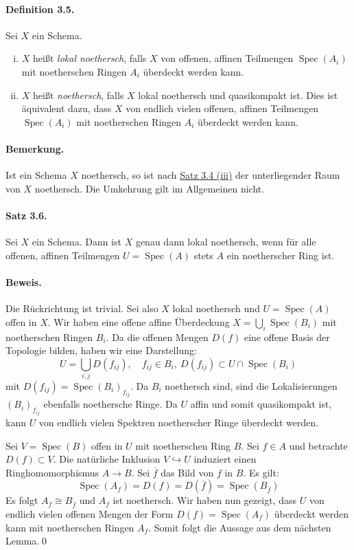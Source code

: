 \paragraph{Definition 3.5.}\label{3.5} Sei $X$ ein Schema.
\begin{enumerate}[(i)]
\item $X$ heißt \textit{lokal noethersch}, falls $X$ von offenen, affinen Teilmengen $\operatorname{Spec}(A_i)$ mit noetherschen Ringen $A_i$ überdeckt werden kann.
\item $X$ heißt \textit{noethersch}, falls $X$ lokal noethersch und quasikompakt ist. Dies ist äquivalent dazu, dass $X$ von endlich vielen offenen, affinen Teilmengen $\operatorname{Spec}(A_i)$ mit noetherschen Ringen $A_i$ überdeckt werden kann.
\end{enumerate}

\paragraph{Bemerkung.} Ist ein Schema $X$ noethersch, so ist nach \hyperref[3.4]{Satz 3.4 (iii)} der unterliegender Raum von $X$ noethersch. Die Umkehrung gilt im Allgemeinen nicht.

\paragraph{Satz 3.6.}\label{3.6} Sei $X$ ein Schema. Dann ist $X$ genau dann lokal noethersch, wenn für alle offenen, affinen Teilmengen $U=\operatorname{Spec}(A)$ stets $A$ ein noetherscher Ring ist.

\paragraph{Beweis.} Die Rückrichtung ist trivial. Sei also $X$ lokal noethersch und $U=\operatorname{Spec}(A)$ offen in $X$. Wir haben eine offene affine Überdeckung $X=\bigcup_i\operatorname{Spec}(B_i)$ mit noetherschen Ringen $B_i$. Da die offenen Mengen $D(f)$ eine offene Basis der Topologie bilden, haben wir eine Darstellung:
\[U=\bigcup_{i,j} D(f_{ij}),\quad f_{ij}\in B_i,\ D(f_{ij})\subset U\cap \operatorname{Spec}(B_i) \]
mit $D(f_{ij})=\operatorname{Spec}(B_i)_{f_{ij}}$. Da $B_i$ noethersch sind, sind die Lokalisierungen $(B_i)_{f_{ij}}$ ebenfalls noethersche Ringe. Da $U$ affin und somit quasikompakt ist, kann $U$ von endlich vielen Spektren noetherscher Ringe überdeckt werden.

Sei $V=\operatorname{Spec}(B)$ offen in $U$ mit noetherschen Ring $B$. Sei $f\in A$ und betrachte $D(f)\subset V$. Die natürliche Inklusion $V\hookrightarrow U$ induziert einen Ringhomomorphismus $A\to B$. Sei $\overline{f}$ das Bild von $f$ in $B$. Es gilt:
\[\operatorname{Spec}(A_f)=D(f)=D(\overline{f})=\operatorname{Spec}(B_{\overline{f}})\]
Es folgt $A_f\cong B_{\overline{f}}$ und $A_f$ ist noethersch. Wir haben nun gezeigt, dass $U$ von endlich vielen offenen Mengen der Form $D(f)=\operatorname{Spec}(A_f)$ überdeckt werden kann mit noetherschen Ringen $A_f$. Somit folgt die Aussage aus dem nächsten Lemma.\qed

